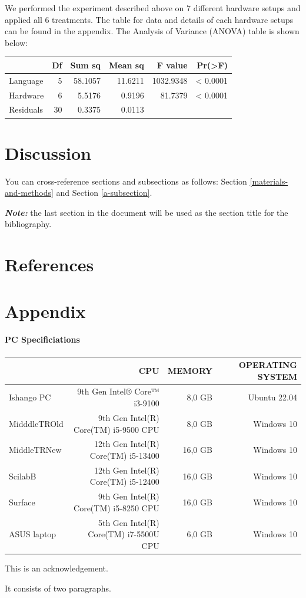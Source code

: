 \documentclass[12pt,halfline,a4paper,]{ouparticle}
\begin{document}
We performed the experiment described above on 7 different hardware
setups and applied all 6 treatments. The table for data and details of
each hardware setups can be found in the appendix. The Analysis of
Variance (ANOVA) table is shown below:

\begin{longtable}[]{@{}lrrrrr@{}}
\toprule\noalign{}
& Df & Sum sq & Mean sq & F value & Pr(\textgreater F) \\
\midrule\noalign{}
\endhead
\bottomrule\noalign{}
\endlastfoot
Language & 5 & 58.1057 & 11.6211 & 1032.9348 & \textless{} 0.0001 \\
Hardware & 6 & 5.5176 & 0.9196 & 81.7379 & \textless{} 0.0001 \\
Residuals & 30 & 0.3375 & 0.0113 & & \\
\end{longtable}

\section{Discussion}\label{discussion}

You can cross-reference sections and subsections as follows: Section
\ref{materials-and-methods} and Section \ref{a-subsection}.

\textbf{\emph{Note:}} the last section in the document will be used as
the section title for the bibliography.

\section{References}\label{references}

\section{Appendix}\label{appendix}

\paragraph{PC Specificiations}\label{pc-specificiations}

\hfill\break

\begin{tabular}{l|r|r|r}
\hline
  & CPU & MEMORY & OPERATING SYSTEM\\
\hline
Ishango PC &  9th Gen Intel® Core™ i3-9100  & 8,0 GB &  Ubuntu 22.04\\
\hline
MidddleTROld & 9th Gen Intel(R) Core(TM) i5-9500 CPU & 8,0 GB &  Windows 10\\
\hline
MiddleTRNew & 12th Gen Intel(R) Core(TM) i5-13400 & 16,0 GB &  Windows 10\\
\hline
ScilabB &  12th Gen Intel(R) Core(TM) i5-12400 &  16,0 GB  &  Windows 10\\
\hline
Surface &  9th Gen Intel(R) Core(TM) i5-8250 CPU &  16,0 GB  &  Windows 10\\
\hline
ASUS laptop &  5th Gen Intel(R) Core(TM) i7-5500U CPU &  6,0 GB  &  Windows 10\\
\end{tabular}

\hfill\break


\begin{notes}[Acknowledgements]
This is an acknowledgement.

It consists of two paragraphs.
\end{notes}
\end{document}
